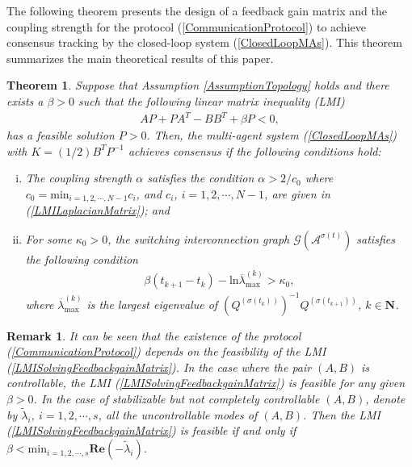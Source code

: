 \documentclass[letterpaper, 10 pt, conference]{ieeeconf}
\newtheorem{theorem}{Theorem}
\newtheorem{remark}{Remark}
\begin{document}
The following theorem presents
the design of a feedback gain matrix and
the coupling strength
for the protocol
(\ref{CommunicationProtocol}) to achieve
consensus tracking by the closed-loop system (\ref{ClosedLoopMAs}).
This theorem summarizes the main theoretical results of this paper.
\begin{theorem}\label{MainTheoremOne}
Suppose that Assumption \ref{AssumptionTopology} holds and there exists a
$\beta>0$ such that the following linear matrix inequality (LMI)
\begin{eqnarray}\label{LMISolvingFeedbackgainMatrix}
\label{LMISolvingFeedbackgainMatrixCorollary}
  AP+PA^{T}-BB^{T}+\beta P<0,
  \end{eqnarray}
has a feasible solution $P>0$. Then, the multi-agent system
(\ref{ClosedLoopMAs}) with $K=(1/2)B^{T}P^{-1}$ achieves consensus if the
following conditions hold:
\begin{enumerate}[(i)]
\item
The coupling strength $\alpha$ satisfies the condition $\alpha>2/c_{0}$ where
$c_{0}=\mathrm{min}_{i=1,2,\cdots,N-1}c_{i}$, and $c_{i}$,
$i=1,2,\cdots,N-1$, are given in (\ref{LMILaplacianMatrix}); and
\item
For some $\kappa_0>0$, the switching interconnection graph
$\mathcal{G}(\mathcal{A}^{\sigma(t)})$
satisfies the following condition
\begin{eqnarray}\label{TheoremCondiiton}
\beta (t_{k+1}-t_{k}) - \mathrm{ln}\overline{\lambda}_{\mathrm{max}}^{(k)}>
\kappa_0,
\end{eqnarray}
where $\overline{\lambda}_{\mathrm{max}}^{(k)}$ is the largest eigenvalue
of $\left(Q^{(\sigma(t_{k}))}\right)^{-1}Q^{(\sigma(t_{k+1}))}$, $k\in
\mathbf{N}$.
\end{enumerate}
\end{theorem}








\begin{remark}
It can be seen that the existence
of the protocol (\ref{CommunicationProtocol}) depends on the feasibility of
the LMI (\ref{LMISolvingFeedbackgainMatrix}).
In the case where the pair $(A,B)$ is controllable, the LMI
(\ref{LMISolvingFeedbackgainMatrix}) is feasible for any given $\beta>0$.
In the case of stabilizable  but not completely controllable $(A,B)$,
denote by $\widetilde{\lambda}_{i}$, $i=1,2,\cdots,s$, all the
uncontrollable modes of $(A,B)$. Then the LMI
(\ref{LMISolvingFeedbackgainMatrix}) is feasible if and only if
$\beta<\mathrm{min}_{i=1,2,\cdots,s}\mathbf{Re}(-\widetilde{\lambda}_{i})$.
\end{remark}
\end{document}
